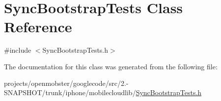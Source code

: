 \hypertarget{interface_sync_bootstrap_tests}{
\section{\-Sync\-Bootstrap\-Tests \-Class \-Reference}
\label{interface_sync_bootstrap_tests}
}


{\ttfamily \#include $<$\-Sync\-Bootstrap\-Tests.\-h$>$}



\-The documentation for this class was generated from the following file\-:\begin{DoxyCompactItemize}
\item 
projects/openmobster/googlecode/src/2.-\/\-S\-N\-A\-P\-S\-H\-O\-T/trunk/iphone/mobilecloudlib/\hyperlink{_sync_bootstrap_tests_8h}{\-Sync\-Bootstrap\-Tests.\-h}\end{DoxyCompactItemize}
